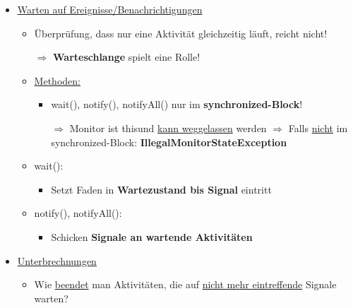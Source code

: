 \documentclass[parskip=full, 12pt]{scrartcl}
\begin{document}
\begin{itemize}
					\item \underline{Warten auf Ereignisse/Benachrichtigungen}
					\begin{itemize}
						\item Überprüfung, dass nur eine Aktivität gleichzeitig läuft, reicht nicht!

						$\Rightarrow$ \textbf{Warteschlange} spielt eine Rolle!
						\newpage
						\item \underline{Methoden:}
						\begin{itemize}
							\item wait(), notify(), notifyAll() nur im \textbf{synchronized-Block}!
							
							$\Rightarrow$ Monitor ist \dq this\dq und \underline{kann weggelassen} werden
							\newline
							$\Rightarrow$ Falls \underline{nicht} im synchronized-Block: \textbf{IllegalMonitorStateException}
						\end{itemize}
						\item wait():
						\begin{itemize}
							\item Setzt Faden in \textbf{Wartezustand bis Signal} eintritt
							
							\color{red}{$\Rightarrow$ IMMER in einer Schleife!}
							\newline							
							\color{red}{$\Rightarrow$ Bedingung VOR und NACH dem Warten prüfen!}
						\end{itemize}
						\item notify(), notifyAll():
						\begin{itemize}
							\item Schicken \textbf{Signale an wartende Aktivitäten}
							
							\color{red}{$\Rightarrow$ Sicher ist nur: notifyAll()}
						\end{itemize}
					\end{itemize}
					\item \underline{Unterbrechnungen}
					\begin{itemize}
						\item Wie \underline{beendet} man Aktivitäten, die auf \underline{nicht mehr eintreffende} Signale warten?
						

\end{itemize}
\end{itemize}
\end{document}
